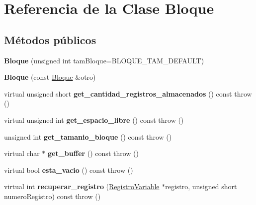 \hypertarget{class_bloque}{\section{\-Referencia de la \-Clase \-Bloque}
\label{class_bloque}
}
\subsection*{\-Métodos públicos}
\begin{DoxyCompactItemize}
\item 
\hypertarget{class_bloque_a7232bf64ec327c50e3a8ee290c64dc7f}{{\bfseries \-Bloque} (unsigned int tam\-Bloque=\-B\-L\-O\-Q\-U\-E\-\_\-\-T\-A\-M\-\_\-\-D\-E\-F\-A\-U\-L\-T)}\label{class_bloque_a7232bf64ec327c50e3a8ee290c64dc7f}

\item 
\hypertarget{class_bloque_a4ff2941146dcf968a55c7e2a0e12e588}{{\bfseries \-Bloque} (const \hyperlink{class_bloque}{\-Bloque} \&otro)}\label{class_bloque_a4ff2941146dcf968a55c7e2a0e12e588}

\item 
\hypertarget{class_bloque_aa3b31869940fd97ec4f7d6720b7f7230}{virtual unsigned short {\bfseries get\-\_\-cantidad\-\_\-registros\-\_\-almacenados} () const   throw ()}\label{class_bloque_aa3b31869940fd97ec4f7d6720b7f7230}

\item 
\hypertarget{class_bloque_a3c166bcf2b151c7df8f9b2127f54163b}{virtual unsigned int {\bfseries get\-\_\-espacio\-\_\-libre} () const   throw ()}\label{class_bloque_a3c166bcf2b151c7df8f9b2127f54163b}

\item 
\hypertarget{class_bloque_a82779c8c20203652f47990ecf6ee6560}{unsigned int {\bfseries get\-\_\-tamanio\-\_\-bloque} () const   throw ()}\label{class_bloque_a82779c8c20203652f47990ecf6ee6560}

\item 
\hypertarget{class_bloque_aa8f4a394d9d0521c157f4ae70cfef8d0}{virtual char $\ast$ {\bfseries get\-\_\-buffer} () const   throw ()}\label{class_bloque_aa8f4a394d9d0521c157f4ae70cfef8d0}

\item 
\hypertarget{class_bloque_ab86aed096c2182dfa60e78b9b46bf076}{virtual bool {\bfseries esta\-\_\-vacio} () const   throw ()}\label{class_bloque_ab86aed096c2182dfa60e78b9b46bf076}

\item 
\hypertarget{class_bloque_ad5c7617c75b6e657eddebafcb1e2c7ab}{virtual int {\bfseries recuperar\-\_\-registro} (\hyperlink{class_registro_variable}{\-Registro\-Variable} $\ast$registro, unsigned short numero\-Registro) const   throw ()}\label{class_bloque_ad5c7617c75b6e657eddebafcb1e2c7ab}


\end{DoxyCompactItemize}
